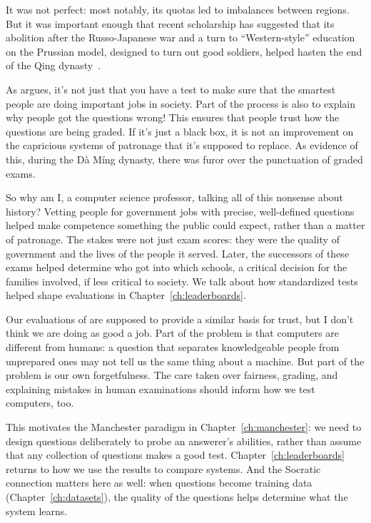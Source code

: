 It was not perfect: most notably, its quotas led to imbalances between regions.
%
But it was important enough that recent scholarship has suggested that its abolition
after the Russo-Japanese war and a turn to ``Western-style'' education on the Prussian
model, designed to turn out good soldiers, helped hasten the end of the Q\-ing
dynasty~\citep{bai-16}.

As \citet{chu-15} argues, it’s not just that you have a test to make sure that the
smartest people are doing important jobs in society.
%
Part of the process is also to explain why people got the questions wrong!
%
This ensures that people trust how the questions are being graded.
%
If it’s just a black box, it is not an improvement on the capricious systems of
patronage that it’s supposed to replace.
%
As evidence of this, during the Dà Míng dynasty, there was furor over the punctuation
of graded exams.

So why am I, a computer science professor, talking all of this nonsense
about history?
%
Vetting people for government jobs with precise,
well-defined questions helped make competence something the public could
expect, rather than a matter of patronage.
%
The stakes were not just
exam scores: they were the quality of government and the lives of the
people it served.
%
Later, the successors of these exams helped determine who got into which schools,
a critical decision for the families involved, if less critical to society.
%
We talk about how standardized tests helped shape  evaluations in Chapter~\ref{ch:leaderboards}.

Our evaluations of  are supposed to provide a similar basis for
trust, but I don't think we are doing as good a job.  Part of the problem
is that computers are different from humans: a question that separates
knowledgeable people from unprepared ones may not tell us the same thing
about a machine.  But part of the problem is our own forgetfulness.  The
care taken over fairness, grading, and explaining mistakes in human
examinations should inform how we test computers, too.

This motivates the Manchester paradigm in Chapter~\ref{ch:manchester}:
we need to design questions deliberately to probe an answerer's
abilities, rather than assume that any collection of questions makes a
good test.  Chapter~\ref{ch:leaderboards} returns to how we use the results
to compare systems.  And the Socratic connection matters here as well:
when questions become training data (Chapter~\ref{ch:datasets}), the
quality of the questions helps determine what the system learns.

%

%
